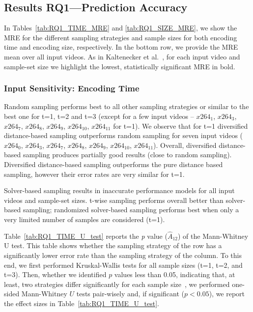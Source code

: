 \subsection{Results RQ1—Prediction Accuracy} \label{RQ1}

In Tables~\ref{tab:RQ1_TIME_MRE} and \ref{tab:RQ1_SIZE_MRE}, we show the MRE for the different sampling strategies and sample sizes for both encoding time and encoding size, respectively.
In the bottom row, we provide the MRE mean over all input videos.
As in Kaltenecker et al.~\cite{kaltenecker2019}, for each input video and sample-set size we highlight the lowest, statistically significant MRE in bold.




%

\subsubsection{Input Sensitivity: Encoding Time}

Random sampling performs best to all other sampling strategies or similar to the best one for t=1, t=2 and t=3 (except for a few input videos -- $x264_1$, $x264_3$, $x264_7$, $x264_{8}$, $x264_{9}$, $x264_{10}$, $x264_{11}$ for t=1).
We observe that for t=1 diversified distance-based sampling outperforms random sampling for seven input videos ($x264_0$, $x264_3$, $x264_7$, $x264_{8}$, $x264_{9}$, $x264_{10}$, $x264_{11}$).
Overall, diversified distance-based sampling produces partially good results (close to random sampling).
Diversified distance-based sampling outperforms the pure distance based sampling, however their error rates are very similar for t=1.

Solver-based sampling results in inaccurate performance models for all input videos and sample-set sizes.
t-wise sampling performs overall better than solver-based sampling; randomized solver-based sampling performs best when only a very limited number of samples are considered (\ie t=1).

Table~\ref{tab:RQ1_TIME_U_test} reports the \textit{p} value ($\hat{A}_{12}$) of the Mann-Whitney U test.
This table shows whether the sampling strategy of the row has a significantly lower error rate than the sampling strategy of the column.
To this end, we first performed Kruskal-Wallis tests for all sample sizes (t=1, t=2, and t=3).
Then, whether we identified $p$ values less than 0.05, indicating that, at least, two strategies differ significantly for each sample size~\cite{kaltenecker2019}, we performed one-sided Mann-Whitney $U$ tests pair-wisely and, if significant ($p < 0.05$), we report the effect sizes in Table~\ref{tab:RQ1_TIME_U_test}. 
 
